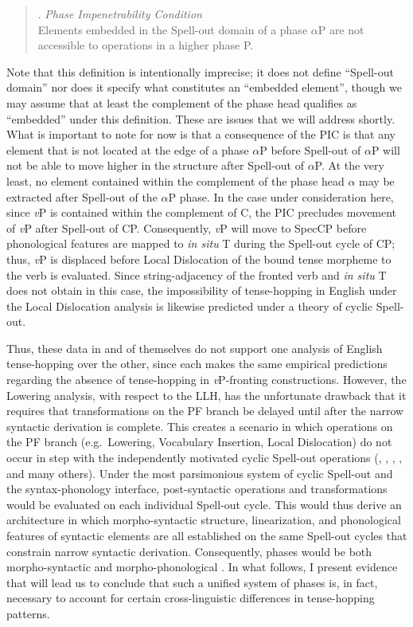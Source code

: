 \singlespacing
\begin{quote}
\ex. {\it Phase Impenetrability Condition}\\
Elements embedded in the Spell-out domain of a phase $\alpha$P are not accessible to operations in a higher phase {\it \textbeta}P. 

\end{quote}
\onehalfspacing
Note that this definition is intentionally imprecise; it does not define ``Spell-out domain'' nor does it specify what constitutes an ``embedded element'', though we may assume that at least the complement of the phase head qualifies as ``embedded'' under this definition. These are issues that we will address shortly. What is important to note for now is that a consequence of the PIC is that any element that is not located at the edge of a phase $\alpha$P before Spell-out of $\alpha$P will not be able to move higher in the structure after Spell-out of $\alpha$P. At the very least, no element contained within the complement of the phase head $\alpha$ may be extracted after Spell-out of the $\alpha$P phase. In the case under consideration here, since {\it v}P is contained within the complement of C, the PIC precludes movement of {\it v}P after Spell-out of CP. Consequently, {\it v}P will move to SpecCP before phonological features are mapped to {\it in situ} T during the Spell-out cycle of CP; thus, {\it v}P is displaced before Local Dislocation of the bound tense morpheme to the verb is evaluated. Since string-adjacency of the fronted verb and {\it in situ} T does not obtain in this case, the impossibility of tense-hopping in English under the Local Dislocation analysis is likewise predicted under a theory of cyclic Spell-out.

Thus, these data in and of themselves do not support one analysis of English tense-hopping over the other, since each makes the same empirical predictions regarding the absence of tense-hopping in {\it v}P-fronting constructions. However, the Lowering analysis, with respect to the LLH, has the unfortunate drawback that it requires that transformations on the PF branch be delayed until after the narrow syntactic derivation is complete. This creates a scenario in which operations on the PF branch (e.g.\ Lowering, Vocabulary Insertion, Local Dislocation) do not occur in step with the independently motivated cyclic Spell-out operations (, , , , and many others). Under the most parsimonious system of cyclic Spell-out and the syntax-phonology interface, post-syntactic operations and transformations would be evaluated on each individual Spell-out cycle. This would thus derive an architecture in which morpho-syntactic structure, linearization, and phonological features of syntactic elements are all established on the same Spell-out cycles that constrain narrow syntactic derivation. Consequently, phases would be both morpho-syntactic and morpho-phonological \citep{piggott_newell2006}. In what follows, I present evidence that will lead us to conclude that such a unified system of phases is, in fact, necessary to account for certain cross-linguistic differences in tense-hopping patterns.\\

